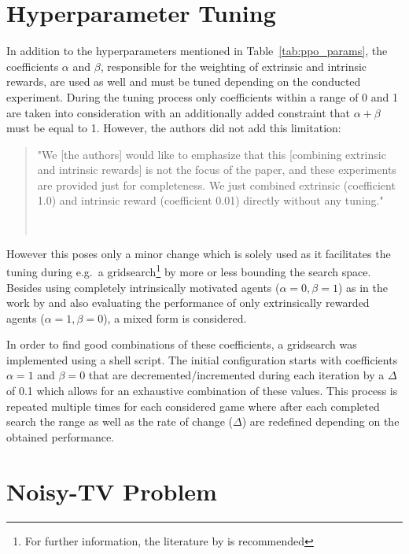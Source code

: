 \documentclass[draft,final]{vutinfth} %
\newcommand{\p}[1]{see p. #1}
\begin{document}
    \section{Hyperparameter Tuning}\label{sec:hyperparameter-tuning}

    In addition to the hyperparameters mentioned in Table~\ref{tab:ppo_params}, the coefficients $\alpha$ and $\beta$, responsible for the weighting of extrinsic and intrinsic rewards, are used as well and must be tuned depending on the conducted experiment.
    During the tuning process only coefficients within a range of 0 and 1 are taken into consideration with an additionally added constraint that $\alpha + \beta$ must be equal to 1.
    However, the authors did not add this limitation:

    \begin{quote}
        "We [the authors] would like to emphasize that this [combining extrinsic and intrinsic rewards] is not the focus of the paper, and these experiments are provided just for completeness.
        We just combined extrinsic (coefficient 1.0) and intrinsic reward (coefficient 0.01) directly without any tuning."

        \hfill~\cite[\p{9}]{burda_large-scale_2018-1}
    \end{quote}

    However this poses only a minor change which is solely used as it facilitates the tuning during e.g.\ a gridsearch\footnote{For further information, the literature by \citet[\p{420ff}]{goodfellow_deep_2016} is recommended} by more or less bounding the search space.
    Besides using completely intrinsically motivated agents ($\alpha=0,\beta=1$) as in the work by \citet{burda_large-scale_2018-1} and also evaluating the performance of only extrinsically rewarded agents ($\alpha=1,\beta=0$), a mixed form is considered.

    In order to find good combinations of these coefficients, a gridsearch was implemented using a shell script.
    The initial configuration starts with coefficients $\alpha=1$ and $\beta=0$ that are decremented/incremented during each iteration by a $\Delta$ of 0.1 which allows for an exhaustive combination of these values.
    This process is repeated multiple times for each considered game where after each completed search the range as well as the rate of change ($\Delta$) are redefined depending on the obtained performance.


    \section{Noisy-TV Problem}\label{sec:noisy-tv-problem}
\end{document}
